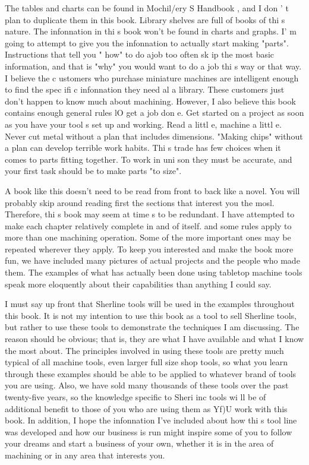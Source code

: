 The tables and charts can be found in Mochil/ery S Handbook , and I don ' t plan
to duplicate them in this book. Library shelves are full of books of thi s
nature. The infonnation in thi s book won't be found in charts and graphs. I' m
going to attempt to give you the infonnation to actually start making "parts".
Instructions that tell you " how" to do ajob too often sk ip the most basic
information, and that is "why" you would want to do a job thi s way or that way.
I believe the c ustomers who purchase miniature machines are intelligent enough
to find the spec ifi c infonnation they need al a library. These customers just
don't happen to know much about machining. However, I also believe this book
contains enough general rules lO get a job don e. Get started on a project as
soon as you have your tool s set up and working.
Read a littl e, machine a littl e. Never cut metal without a plan that includes
dimensions. "Making chips" without a plan can develop terrible work habits. Thi
s trade has few choices when it comes to parts fitting together. To work in uni
son they must be accurate, and your first task should be to make parts "to
size".


A book like this doesn't need to be read from front to back like a novel. You
will probably skip around reading first the sections that interest you the mosl.
Therefore, thi s book may seem at time s to be redundant. I have attempted to
make each chapter relatively complete in and of itself. and some rules apply to
more than one machining operation. Some of the more important ones may be
repeated wherever they apply. To keep you interested and make the book more fun,
we have included many pictures of actual projects and the people who made them.
The examples of what has actually been done using tabletop machine tools speak
more eloquently about their capabilities than anything I could say.


I must say up front that Sherline tools will be used in the examples throughout
this book. It is not my intention to use this book as a tool to sell Sherline
tools, but rather to use these tools to demonstrate the techniques I am
discussing. The reason should be obvious; that is, they are what I have
available and what I know the most about. The principles involved in using these
tools are pretty much typical of all machine tools, even larger full size shop
tools, so what you learn through these examples should be able to be applied to
whatever brand of tools you are using. Also, we have sold many thousands of
these tools over the past twenty-five years, so the knowledge specific to Sheri
inc tools wi ll be of additional benefit to those of you who are using them as
Yf)U work with this book. In addition, I hope the infonnation I've included
about how thi s tool line was developed and how our business is run might
inspire some of you to follow your dreams and start a business of your own,
whether it is in the area of machining or in any area that interests you.

